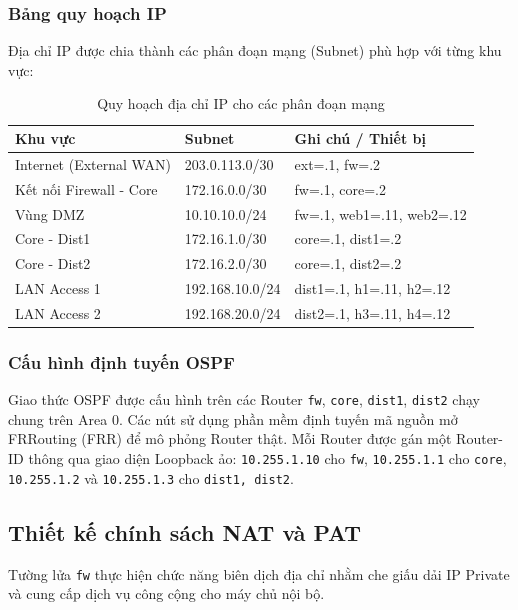 \subsubsection{Bảng quy hoạch IP}
Địa chỉ IP được chia thành các phân đoạn mạng (Subnet) phù hợp với từng khu vực:
\begin{table}[H]
    \centering
    \caption{Quy hoạch địa chỉ IP cho các phân đoạn mạng}
    \begin{tabular}{|l|l|l|}
    \hline
    \rowcolor[HTML]{EFEFEF} 
    \textbf{Khu vực} & \textbf{Subnet} & \textbf{Ghi chú / Thiết bị} \\ \hline
    Internet (External WAN) & 203.0.113.0/30 & ext=.1, fw=.2 \\ \hline
    Kết nối Firewall - Core & 172.16.0.0/30 & fw=.1, core=.2 \\ \hline
    Vùng DMZ & 10.10.10.0/24 & fw=.1, web1=.11, web2=.12 \\ \hline
    Core - Dist1 & 172.16.1.0/30 & core=.1, dist1=.2 \\ \hline
    Core - Dist2 & 172.16.2.0/30 & core=.1, dist2=.2 \\ \hline
    LAN Access 1 & 192.168.10.0/24 & dist1=.1, h1=.11, h2=.12 \\ \hline
    LAN Access 2 & 192.168.20.0/24 & dist2=.1, h3=.11, h4=.12 \\ \hline
    \end{tabular}
\end{table}

\subsubsection{Cấu hình định tuyến OSPF}
Giao thức OSPF được cấu hình trên các Router \texttt{fw}, \texttt{core}, \texttt{dist1}, \texttt{dist2} chạy chung trên Area 0. Các nút sử dụng phần mềm định tuyến mã nguồn mở FRRouting (FRR) để mô phỏng Router thật.
Mỗi Router được gán một Router-ID thông qua giao diện Loopback ảo: \texttt{10.255.1.10} cho \texttt{fw}, \texttt{10.255.1.1} cho \texttt{core}, \texttt{10.255.1.2} và \texttt{10.255.1.3} cho \texttt{dist1, dist2}.

\subsection{Thiết kế chính sách NAT và PAT}
Tường lửa \texttt{fw} thực hiện chức năng biên dịch địa chỉ nhằm che giấu dải IP Private và cung cấp dịch vụ công cộng cho máy chủ nội bộ.

